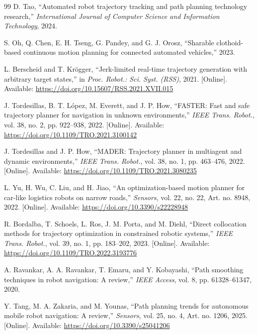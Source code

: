 \begin{thebibliography}{99}
D. Tao, ``Automated robot trajectory tracking and path planning technology research,'' \emph{International Journal of Computer Science and Information Technology}, 2024.

S. Oh, Q. Chen, E. H. Tseng, G. Pandey, and G. J. Orosz, ``Sharable clothoid-based continuous motion planning for connected automated vehicles,'' 2023.


L. Berscheid and T. Kr\"ogger, ``Jerk-limited real-time trajectory generation with arbitrary target states,'' in \emph{Proc. Robot.: Sci. Syst. (RSS)}, 2021. [Online]. Available: \url{https://doi.org/10.15607/RSS.2021.XVII.015}

J. Tordesillas, B. T. L\'opez, M. Everett, and J. P. How, ``FASTER: Fast and safe trajectory planner for navigation in unknown environments,'' \emph{IEEE Trans. Robot.}, vol. 38, no. 2, pp. 922--938, 2022. [Online]. Available: \url{https://doi.org/10.1109/TRO.2021.3100142}

J. Tordesillas and J. P. How, ``MADER: Trajectory planner in multiagent and dynamic environments,'' \emph{IEEE Trans. Robot.}, vol. 38, no. 1, pp. 463--476, 2022. [Online]. Available: \url{https://doi.org/10.1109/TRO.2021.3080235}

L. Yu, H. Wu, C. Liu, and H. Jiao, ``An optimization-based motion planner for car-like logistics robots on narrow roads,'' \emph{Sensors}, vol. 22, no. 22, Art. no. 8948, 2022. [Online]. Available: \url{https://doi.org/10.3390/s22228948}

R. Bordalba, T. Schoels, L. Ros, J. M. Porta, and M. Diehl, ``Direct collocation methods for trajectory optimization in constrained robotic systems,'' \emph{IEEE Trans. Robot.}, vol. 39, no. 1, pp. 183--202, 2023. [Online]. Available: \url{https://doi.org/10.1109/TRO.2022.3193776}

A. Ravankar, A. A. Ravankar, T. Emaru, and Y. Kobayashi, ``Path smoothing techniques in robot navigation: A review,'' \emph{IEEE Access}, vol. 8, pp. 61328--61347, 2020.

Y. Tang, M. A. Zakaria, and M. Younas, ``Path planning trends for autonomous mobile robot navigation: A review,'' \emph{Sensors}, vol. 25, no. 4, Art. no. 1206, 2025. [Online]. Available: \url{https://doi.org/10.3390/s25041206} 


\end{thebibliography}
